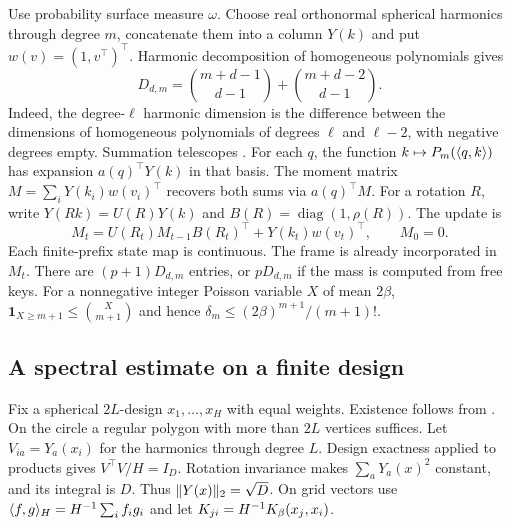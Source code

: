 Use probability surface measure $\omega$. Choose real orthonormal spherical harmonics through degree $m$, concatenate them into a column $Y(k)$ and put $w(v)=(1,v^\top)^\top$. Harmonic decomposition of homogeneous polynomials gives
\[
 D_{d,m}=\binom{m+d-1}{d-1}+\binom{m+d-2}{d-1}.
\]
Indeed, the degree-$\ell$ harmonic dimension is the difference between the dimensions of homogeneous polynomials of degrees $\ell$ and $\ell-2$, with negative degrees empty. Summation telescopes \cite{atkinson}. For each $q$, the function $k\mapsto P_m(\langle q,k\rangle)$ has expansion $a(q)^\top Y(k)$ in that basis. The moment matrix
$M=\sum_iY(k_i)w(v_i)^\top$ recovers both sums via $a(q)^\top M$. For a rotation $R$, write $Y(Rk)=U(R)Y(k)$ and $B(R)=\operatorname{diag}(1,\rho(R))$. The update is
\begin{equation}
 M_{t}=U(R_t) M_{t-1} B(R_t)^\top+Y(k_t)w(v_t)^\top,\qquad M_0=0.
 \label{eq:update}
\end{equation}
Each finite-prefix state map is continuous. The frame is already incorporated in $M_t$. There are $(p+1)D_{d,m}$ entries, or $pD_{d,m}$ if the mass is computed from free keys. For a nonnegative integer Poisson variable $X$ of mean $2\beta$,
$\mathbf1_{X\ge m+1}\le\binom{X}{m+1}$ and hence $\delta_m\le(2\beta)^{m+1}/(m+1)!$.

\subsection{A spectral estimate on a finite design}\label{sec:spectral}
Fix a spherical $2L$-design $x_1,\ldots,x_H$ with equal weights. Existence follows from \cite{design}. On the circle a regular polygon with more than $2L$ vertices suffices. Let $V_{ia}=Y_a(x_i)$ for the harmonics through degree $L$. Design exactness applied to products gives $V^\top V/H=I_D$. Rotation invariance makes $\sum_aY_a(x)^2$ constant, and its integral is $D$. Thus $\lVert Y(x)\rVert_2=\sqrt D$. On grid vectors use $\langle f,g\rangle_H=H^{-1}\sum_i f_i g_i$ and let $K_{ji}=H^{-1}K_\beta(x_j,x_i)$.

